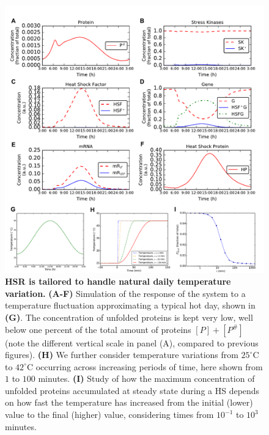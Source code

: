 \documentclass[oneside, 10pt, a4paper, twocolumn]{article}
\begin{document}
\begin{figure}
\centering
\includegraphics[width=\textwidth]{Figure4_Paper.pdf}
\caption{\small{\textbf{HSR is {tailored to handle} natural daily temperature variation.} \textbf{(A-F)} Simulation of the response of the system to a temperature {fluctuation approximating a typical hot day}, shown in \textbf{(G)}. The concentration of unfolded proteins is kept very low, well below one percent of the total amount of proteins $\left[P\right]+\left[P^\#\right]$ (note the different vertical scale in panel (A), compared to previous figures). {\textbf{(H)} We further consider temperature variations from $25^\circ\text{C}$ to $42^\circ\text{C}$ occurring across increasing periods of time, here shown from $1$ to $100$ minutes. \textbf{(I)} Study of how the maximum concentration of unfolded proteins accumulated at steady state during a HS depends on how fast the temperature has increased from the initial (lower) value to the final (higher) value, considering times from $10^{-1}$ to $10^{3}$ minutes.}}
}
\label{Figure4label}
\end{figure}

\clearpage


\appendix

\setcounter{page}{1}


\end{document}
